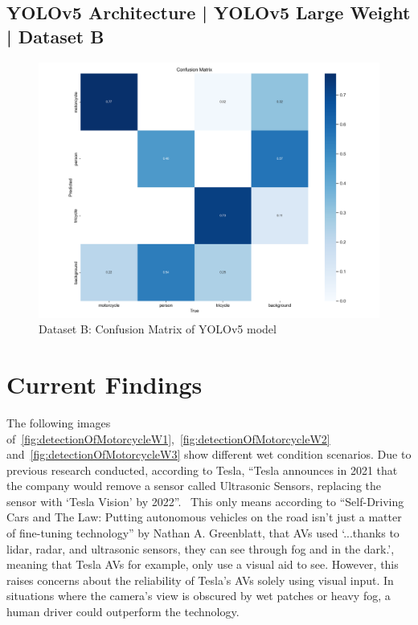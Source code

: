 \documentclass[conference]{IEEEtran}
\begin{document}
	\subsection{YOLOv5 Architecture | YOLOv5 Large Weight | Dataset B}
		\begin{figure}[h]
			\centering
			\includegraphics[width=\columnwidth]{Figures/b_confusion_matrix.png}
			\caption{Dataset B: Confusion Matrix of YOLOv5 model}
			\label{fig:mtpDatasetYolov5LargeWeight}
		\end{figure}

\section{Current Findings}
	The following images of~\ref{fig:detectionOfMotorcycleW1},~\ref{fig:detectionOfMotorcycleW2} and~\ref{fig:detectionOfMotorcycleW3} show different wet condition scenarios. Due to previous research conducted, according to Tesla, ``Tesla announces in 2021 that the company would remove a sensor called Ultrasonic Sensors, replacing the sensor with `Tesla Vision' by 2022''.~\cite{noauthor_tesla_nodate} This only means according to ``Self-Driving Cars and The Law: Putting autonomous vehicles on the road isn't just a matter of fine-tuning technology'' by Nathan A. Greenblatt, that AVs used `...thanks to lidar, radar, and ultrasonic sensors, they can see through fog and in the dark.', meaning that Tesla AVs for example, only use a visual aid to see. However, this raises concerns about the reliability of Tesla's AVs solely using visual input. In situations where the camera's view is obscured by wet patches or heavy fog, a human driver could outperform the technology.
\end{document}

